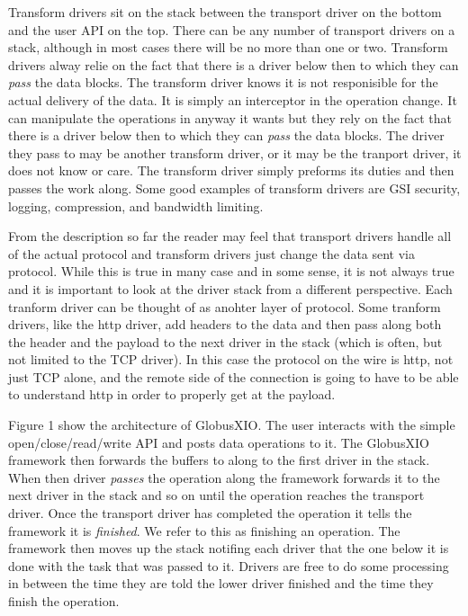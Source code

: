\documentclass[11pt]{article}
\begin{document}
Transform drivers sit on the stack between the transport driver on the
bottom and the user API on the top.  There can be any number of transport
drivers on a stack, although in most cases there will be no more than one or 
two.  Transform drivers alway relie on the fact that there is a driver
below then to which they can \emph{pass} the data blocks.  The transform
driver knows it is not responisible for the actual delivery of the data.
It is simply an interceptor in the operation change.  It can manipulate
the operations in anyway it wants but they rely on the fact that there is
a driver below then to which they can \emph{pass} the data blocks.  The 
driver they pass to may be another transform driver, or it may be the
tranport driver, it does not know or care.  The transform driver simply
preforms its duties and then passes the work along.  Some good examples
of transform drivers are GSI security, logging, compression, 
and bandwidth limiting.

From the description so far the reader may feel that transport drivers
handle all of the actual protocol and transform drivers just change the
data sent via protocol.  While this is true in many case and in some
sense, it is not always true and it is important to look at the driver
stack from a different perspective.  Each tranform driver can be 
thought of as anohter layer of protocol.  Some tranform drivers, like the
http driver, add headers to the data and then pass along both the
header and the payload to the next driver in the stack (which is often,
but not limited to the TCP driver).  In this case the protocol on the
wire is http, not just TCP alone, and the remote side of the connection is
going to have to be able to understand http in order to properly get
at the payload.

Figure 1 show the architecture of GlobusXIO.  The user interacts with 
the simple open/close/read/write API and posts data operations to it.
The GlobusXIO framework then forwards the buffers to along to the first
driver in the stack.  When then driver \emph{passes} the operation along
the framework forwards it to the next driver in the stack and so on
until the operation reaches the transport driver.  Once the transport 
driver has completed the operation it tells the framework it is 
\emph{finished}.  We refer to this as finishing an operation.  The 
framework then moves up the stack notifing each driver that the 
one below it is done with the task that was passed to it.  Drivers
are free to do some processing in between the time they are told
the lower driver finished and the time they finish the operation.
\end{document}
